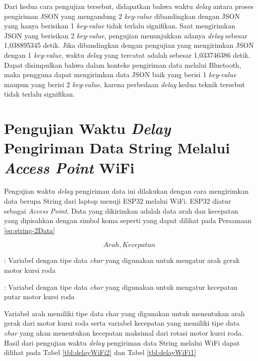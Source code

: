 Dari kedua cara pengujian tersebut, didapatkan bahwa waktu \emph{delay} antara proses pengiriman JSON yang mengandung 2 \emph{key}-\emph{value} dibandingkan dengan JSON yang hanya berisikan 1 \emph{key}-\emph{value} tidak terlalu signifikan. Saat mengirimkan JSON yang berisikan 2 \emph{key}-\emph{value}, pengujian menunjukkan adanya \emph{delay} sebesar 1,038895345 detik. Jika dibandingkan dengan pengujian yang mengirimkan JSON dengan 1 \emph{key}-\emph{value}, waktu \emph{delay} yang tercatat adalah sebesar 1,033746386 detik. Dapat disimpulkan bahwa dalam konteks pengiriman data melalui Bluetooth, maka pengguna dapat mengirimkan data JSON baik yang berisi 1 \emph{key}-\emph{value} maupun yang berisi 2 \emph{key}-\emph{value}, karena perbedaan \emph{delay} kedua teknik tersebut tidak terlalu signifikan.

\section{Pengujian Waktu \emph{Delay} Pengiriman Data String Melalui \emph{Access Point} WiFi}
\label{sec:delayWiFi}

Pengujian waktu \emph{delay} pengiriman data ini dilakukan dengan cara mengirimkan data berupa String dari laptop menuji ESP32 melalui WiFi. ESP32 diatur sebagai \emph{Access Point}. Data yang dikirimkan adalah data arah dan kecepatan yang dipisahkan dengan simbol koma seperti yang dapat dilihat pada Persamaan \ref{eq:string-2Data}

\begin{equation}
  \label{eq:string-2Data}
    Arah,Kecepatan
\end{equation}

\begin{description}[nolistsep]
  \item[Keterangan]
  \item[Arah] : Variabel dengan tipe data \emph{char} yang digunakan untuk mengatur arah gerak motor kursi roda
  \item[Kecepatan] : Variabel dengan tipe data \emph{char} yang digunakan untuk mengatur kecepatan putar motor kursi roda 
\end{description}

Variabel arah memiliki tipe data char yang digunakan untuk menentukan arah gerak dari motor kursi roda serta variabel kecepatan yang memiliki tipe data \emph{char} yang akan menentukan kecepatan maksimal dari rotasi motor kursi roda. Hasil dari pengujian waktu \emph{delay} pengiriman data String melalui WiFi dapat dilihat pada Tabel \ref{tbl:delayWiFi2} dan Tabel \ref{tbl:delayWiFi1}

